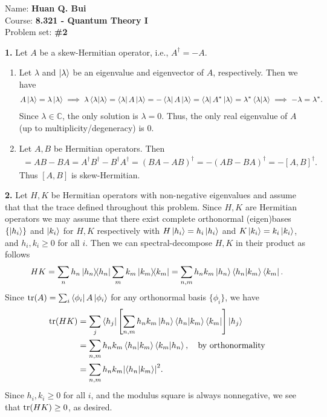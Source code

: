 \documentclass{article}
\theoremstyle{definition}
\newcommand{\lb}{\left[}
\newcommand{\rb}{\right]}
\begin{document}
\begin{framed}
\noindent Name: \textbf{Huan Q. Bui}\\
Course: \textbf{8.321 - Quantum Theory I}\\
Problem set: \textbf{\#2}
\end{framed}
	


\noindent \textbf{1.} Let $A$ be a skew-Hermitian operator, i.e., $A^\dagger = -A$.
\begin{enumerate}[label=(\alph*)]
	\item Let $\lambda$ and $\ket{\lambda}$ be an eigenvalue and eigenvector of $A$, respectively. Then we have
	\begin{align*}
	A\ket{\lambda} = \lambda\ket{\lambda} \implies \lambda\braket{\lambda} = \bra{\lambda}A\ket{\lambda} = -\bra{\lambda}A\ket{\lambda}  = \bra{\lambda}A^*\ket{\lambda} = \lambda^* \braket{\lambda} \implies -\lambda = \lambda^*.
	\end{align*} 
	Since $\lambda \in \mathbb{C}$, the only solution is $\lambda = 0$. Thus, the only real eigenvalue of $A$ (up to multiplicity/degeneracy) is $0$.
	
	  
	
	\item  Let $A,B$ be Hermitian operators. Then
	\begin{align*}
	[A,B] = AB - BA = A^\dagger B^\dagger - B^\dagger A^\dagger = (BA - AB)^\dagger = -(AB-BA)^\dagger = -[A,B]^\dagger.
	\end{align*}
	Thus $[A,B]$ is skew-Hermitian. 
\end{enumerate}



\noindent \textbf{2.} Let $H,K$ be Hermitian operators with non-negative eigenvalues and assume that that the trace defined throughout this problem. Since $H,K$ are Hermitian operators we may assume that there exist complete orthonormal (eigen)bases $\{ \ket{h_i}\}$ and $\ket{k_i}$ for $H,K$ respectively with $H\ket{h_i} = h_i \ket{h_i}$ and $K\ket{k_i} = k_i \ket{k_i}$, and $h_i,k_i \geq 0$ for all $i$. Then we can spectral-decompose $H,K$ in their product as follows
\begin{align*}
HK = \sum_n h_n \ketbra{h_n}\sum_m k_m \ketbra{k_m} = \sum_{n,m} h_n k_m \ket{h_n}\bra{h_n} \ket{k_m}\bra{k_m}.
\end{align*}
Since $\tr(A) = \sum_i \bra{\phi_i} A \ket{\phi_i}$ for any orthonormal basis $\{ \phi_i\}$, we have
\begin{align*}
\tr(HK) &= \sum_j \bra{h_j} \lb  \sum_{n,m} h_n k_m \ket{h_n}\bra{h_n} \ket{k_m}\bra{k_m} \rb    \ket{h_j} \\
&= \sum_{n,m} h_n k_m \bra{h_n} \ket{k_m} \bra{k_m}\ket{h_n}, \quad \text{by orthonormality}\\
&= \sum_{n,m} h_n k_m \abs{\bra{h_n} \ket{k_m}}^2.
\end{align*}
Since $h_i,k_i \geq 0$ for all $i$, and the modulus square is always nonnegative, we see that $\tr(HK) \geq 0$, as desired. \\
\end{document}

